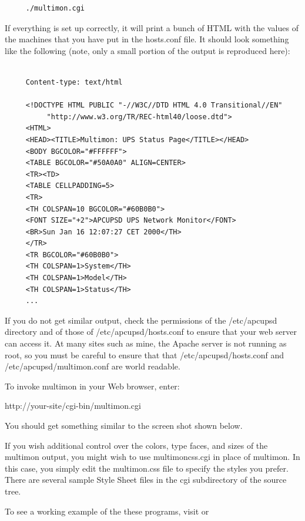 {{{{{{{{\begin{verbatim}
     ./multimon.cgi
\end{verbatim}
\normalsize

If everything is set up correctly, it will print a bunch of HTML with the
values of the machines that you have put in the hosts.conf file. It should
look something like the following (note, only a small portion of the output is
reproduced here): 

\footnotesize
\begin{verbatim}
     
     Content-type: text/html
     
     <!DOCTYPE HTML PUBLIC "-//W3C//DTD HTML 4.0 Transitional//EN"
          "http://www.w3.org/TR/REC-html40/loose.dtd">
     <HTML>
     <HEAD><TITLE>Multimon: UPS Status Page</TITLE></HEAD>
     <BODY BGCOLOR="#FFFFFF">
     <TABLE BGCOLOR="#50A0A0" ALIGN=CENTER>
     <TR><TD>
     <TABLE CELLPADDING=5>
     <TR>
     <TH COLSPAN=10 BGCOLOR="#60B0B0">
     <FONT SIZE="+2">APCUPSD UPS Network Monitor</FONT>
     <BR>Sun Jan 16 12:07:27 CET 2000</TH>
     </TR>
     <TR BGCOLOR="#60B0B0">
     <TH COLSPAN=1>System</TH>
     <TH COLSPAN=1>Model</TH>
     <TH COLSPAN=1>Status</TH>
     ...
\end{verbatim}
\normalsize

If you do not get similar output, check the permissions of the /etc/apcupsd
directory and of those of /etc/apcupsd/hosts.conf to ensure that your web
server can access it. At many sites such as mine, the Apache server is not
running as root, so you must be careful to ensure that that
/etc/apcupsd/hosts.conf and /etc/apcupsd/multimon.conf are world readable.  

To invoke multimon in your Web browser, enter:  

http://\lt{}your-site\gt{}/cgi-bin/multimon.cgi  

You should get something similar to the screen shot shown below.  

If you wish additional control over the colors, type faces, and sizes of the
multimon output, you might wish to use multimoncss.cgi in place of multimon.
In this case, you simply edit the multimon.css file to specify the styles you
prefer.  There are several sample Style Sheet files in the cgi subdirectory of
the source tree.  

To see a working example of the these programs, visit 
 or 

}}}}}}}}
